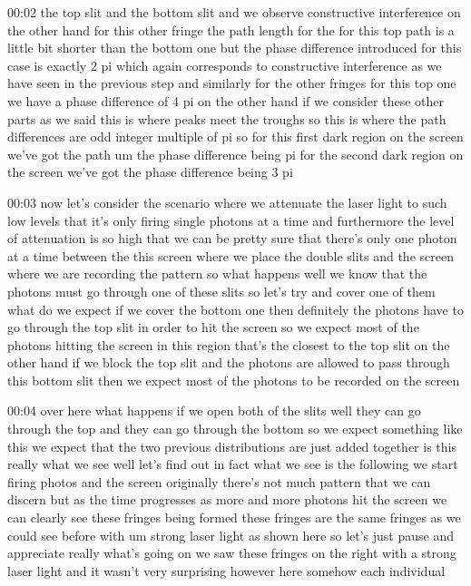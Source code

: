 00:02
the top slit and the bottom slit and we observe constructive interference
on the other hand for this other fringe the path length for the for this top
path is a little bit shorter than the bottom one but the phase
difference introduced for this case is exactly 2 pi which
again corresponds to constructive interference as we have seen in the
previous step and similarly for the other fringes for this top one
we have a phase difference of 4 pi on the other hand if we consider these
other parts as we said this is where peaks meet the troughs
so this is where the path differences are odd
integer multiple of pi so for this first dark region on the screen we've got the
path um the phase difference being pi for the second
dark region on the screen we've got the phase difference being 3 pi

00:03
now let's consider the scenario where we attenuate the laser light
to such low levels that it's only firing single photons at a time
and furthermore the level of attenuation is so high
that we can be pretty sure that there's only one photon
at a time between the this screen where we place the double slits
and the screen where we are recording the pattern
so what happens well we know that the photons must go through one of these slits
so let's try and cover one of them what do we expect
if we cover the bottom one then definitely the photons have to go
through the top slit in order to hit the screen so we expect
most of the photons hitting the screen in this region that's the closest to the
top slit on the other hand if we block the top slit
and the photons are allowed to pass through this bottom slit
then we expect most of the photons to be recorded on the screen

00:04
over here what happens if we open both of the slits well they can go through
the top and they can go through the bottom so we
expect something like this we expect that the two previous distributions
are just added together is this really what we see well let's find out
in fact what we see is the following we start firing photos and the screen
originally there's not much pattern that we can discern but
as the time progresses as more and more photons hit the screen we can clearly
see these fringes being formed these fringes
are the same fringes as we could see before with um strong laser light
as shown here so let's just pause and appreciate really what's going on
we saw these fringes on the right with a strong laser light and it wasn't very
surprising however here somehow each individual

